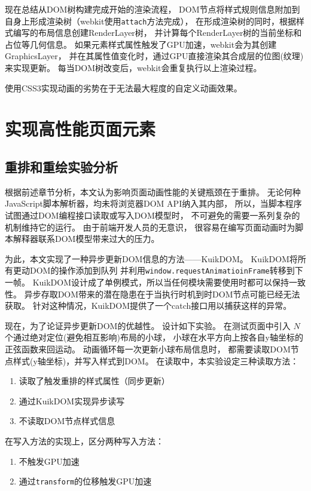 现在总结从DOM树构建完成开始的渲染流程，
DOM节点将样式规则信息附加到自身上形成渲染树（webkit使用\texttt{attach}方法完成），
在形成渲染树的同时，根据样式编写的布局信息创建RenderLayer树，
并计算每个RenderLayer树的当前坐标和占位等几何信息。
如果元素样式属性触发了GPU加速，webkit会为其创建GraphicsLayer，
并在其属性值变化时，通过GPU直接渲染其合成层的位图(纹理)来实现更新。
每当DOM树改变后，webkit会重复执行以上渲染过程。

使用CSS3实现动画的劣势在于无法最大程度的自定义动画效果。

\section{实现高性能页面元素}

\subsection{重排和重绘实验分析}

根据前述章节分析，本文认为影响页面动画性能的关键瓶颈在于重排。
无论何种JavaScript脚本解析器，均未将浏览器DOM API纳入其内部，
所以，当脚本程序试图通过DOM编程接口读取或写入DOM模型时，
不可避免的需要一系列复杂的机制维持它的运行\cite{}。
由于前端开发人员的无意识，
很容易在编写页面动画时为脚本解释器联系DOM模型带来过大的压力。

为此，本文实现了一种异步更新DOM信息的方法——KuikDOM。
KuikDOM将所有更动DOM的操作添加到队列
并利用\texttt{window.requestAnimatioinFrame}转移到下一帧。
KuikDOM设计成了单例模式，所以当任何模块需要使用时都可以保持一致性。
异步存取DOM带来的潜在隐患在于当执行时机到时DOM节点可能已经无法获取。
针对这种情况，KuikDOM提供了一个catch接口用以捕获这样的异常。

现在，为了论证异步更新DOM的优越性。
设计如下实验。
在测试页面中引入 $N$ 个通过绝对定位(避免相互影响)布局的小球，
小球在水平方向上按各自y轴坐标的正弦函数来回运动。
动画循环每一次更新小球布局信息时，
都需要读取DOM节点样式(y轴坐标)，并写入样式到DOM。
在读取中，本实验设定三种读取方法：
\begin{enumerate}
    \item 读取了触发重排的样式属性（同步更新）
    \item 通过KuikDOM实现异步读写
    \item 不读取DOM节点样式信息
\end{enumerate}
在写入方法的实现上，区分两种写入方法：
\begin{enumerate}
    \item 不触发GPU加速
    \item 通过\texttt{transform}的位移触发GPU加速
\end{enumerate}

